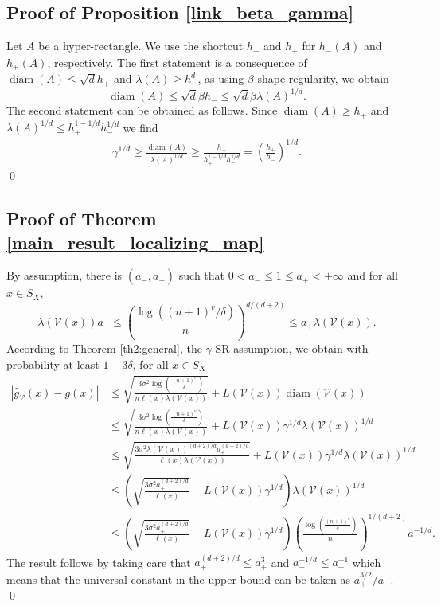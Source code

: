 \documentclass[paper=a4, fontsize=11pt]{scrartcl}
\newcommand{\diam}{\operatorname{diam}}
\begin{document}
\subsection*{Proof of Proposition \ref{link_beta_gamma}}

Let $A$ be a hyper-rectangle. We use the shortcut $h_- $ and $h_+$ for $h_- (A) $ and $ h_+(A)$, respectively. The first statement is a consequence of 
$ \diam (A) \leq \sqrt{d} h_+ $ 
and 
$ \lambda (A) \geq h_- ^d $, as using $\beta $-shape regularity, we obtain
$$ \diam (A)\leq \sqrt{d} \beta h_- \leq \sqrt{d} \beta \lambda (A) ^{1/d}.$$
    The second statement can be obtained as follows. Since $\diam (A) \geq h_ +$ and $ \lambda (A)^{1/d} \leq h_+ ^{1 -1/d}  h_- ^{1/d}$ we find
 \begin{align*}
      \gamma^{1/d} \geq \frac{ \diam (A)}{ \lambda (A)^{1/d} } \geq \frac{ h_ + }{  h_+ ^{1 -1/d}  h_- ^{1/d} } = \left(\frac{  h_ +}{   h_-  } \right)^{1/d}.
\end{align*}\qed




\subsection*{Proof of Theorem \ref{main_result_localizing_map}}
By assumption, there is $(a_-,a_+) $ such that $ 0< a _- \leq 1\leq   a _+ < +\infty $ and for all $x \in S_X$,
$$ \lambda(\mathcal V(x))  a_-  \leq \left( \frac{\log \left({(n+1)^v}/{\delta} \right)}{n} \right)^{d/(d+2)}\leq a_ + \lambda(\mathcal V(x)).$$
According to Theorem \ref{th2:general}, the $\gamma$-SR assumption, we obtain with probability at least $1 - 3\delta $, for all $x\in S_X$
\begin{align*}
        | \hat g_{\mathcal V}(x) - g(x)| &\leq  \sqrt{\frac{ 3 \sigma^2 \log\left( \frac{(n+1)^v}{\delta} \right) }{n  \ell(x) \lambda ( \mathcal V (x) )   }} + L(\mathcal V(x) ) \diam (\mathcal V(x) ) \\ 
        &\leq  \sqrt{\frac{ 3 \sigma^2 \log\left( \frac{(n+1)^v}{\delta} \right) }{n  \ell(x) \lambda ( \mathcal V (x) )   }} + L(\mathcal V(x) )\gamma^{1/d}  \lambda ( \mathcal V (x) )^{1/d} \\ &\leq  \sqrt{\frac{ 3 \sigma^2   \lambda ( \mathcal V (x) )  ^{(d+2)/d}a_+ ^{(d+2)/d}}{ \ell(x) \lambda ( \mathcal V (x) )   }} + L(\mathcal V(x) )\gamma^{1/d}  \lambda ( \mathcal V (x) )^{1/d} \\ &\leq  \left(  \sqrt{\frac{ 3 \sigma^2 a_+ ^{(d+2)/d} }{ \ell(x)}} + L(\mathcal V(x) )\gamma^{1/d} \right)  \lambda ( \mathcal V (x) )^{1/d} \\ &\leq \left( \sqrt{\frac{ 3 \sigma^2 a_+ ^{(d+2)/d}}{ \ell(x)}} + L(\mathcal V(x) )\gamma^{1/d} \right) 
 \left(\frac{\log\left( \frac{(n+1)^v}{ \delta} \right) }{ n} \right) ^{1/(d+2)} a_- ^{-1/d}.
\end{align*}
The result follows by taking care that $a_+ ^{(d+2)/d} \leq a_+^3 $  and $ a_- ^{-1/d}\leq a_-^{-1} $ which means that the universal constant in the upper bound can be taken as $ a_+^{3/2} / a_- $. \qed
\end{document}
